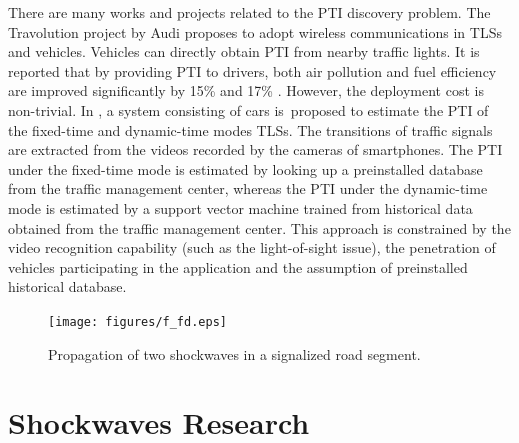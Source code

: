 \documentclass[final,oneside,onecolumn,12pt,a4paper]{book}%
\begin{document}
There are many works and projects related to the PTI discovery problem. The
Travolution project by Audi proposes to adopt wireless communications in TLSs
and vehicles. Vehicles can directly obtain PTI from nearby traffic lights. It
is reported that by providing PTI to drivers, both air pollution and fuel
efficiency are improved significantly by 15\% and 17\% \cite{Audio2011}.
However, the deployment cost is non-trivial. In\textit{ }%
\cite{Koukoumidis2011SignalGuru}, a system consisting of cars is\ proposed to
estimate the PTI of the fixed-time and dynamic-time modes TLSs. The
transitions of traffic signals are extracted from the videos recorded by the
cameras of smartphones. The PTI under the fixed-time mode is estimated by
looking up a preinstalled database from the traffic management center, whereas
the PTI under the dynamic-time mode is estimated by a support vector machine
trained from historical data obtained from the traffic management center. This
approach is constrained by the video recognition capability (such as the
light-of-sight issue), the penetration of vehicles participating in the
application and the assumption of preinstalled historical database.

\begin{figure}[pth]
\centerline{\texttt{[image: figures/f\_fd.eps]}} \hfill\caption{Propagation of two shockwaves in a
signalized road segment.}%
\end{figure}

\section{Shockwaves Research}
\end{document}
